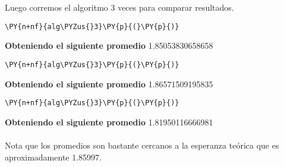 Luego corremos el algoritmo 3 veces para comparar resultados.
  \begin{tcolorbox}[breakable, size=fbox, boxrule=1pt, pad at break*=1mm,colback=cellbackground, colframe=cellborder]
\begin{Verbatim}[commandchars=\\\{\}]
\PY{n+nf}{alg\PYZus{}3}\PY{p}{(}\PY{p}{)}
\end{Verbatim}
\end{tcolorbox}
\textbf{Obteniendo el siguiente promedio}
    1.85053830658658

    
    \begin{tcolorbox}[breakable, size=fbox, boxrule=1pt, pad at break*=1mm,colback=cellbackground, colframe=cellborder]
\begin{Verbatim}[commandchars=\\\{\}]
\PY{n+nf}{alg\PYZus{}3}\PY{p}{(}\PY{p}{)}
\end{Verbatim}
\end{tcolorbox}
\textbf{Obteniendo el siguiente promedio}
    1.86571509195835

    
    \begin{tcolorbox}[breakable, size=fbox, boxrule=1pt, pad at break*=1mm,colback=cellbackground, colframe=cellborder]
\begin{Verbatim}[commandchars=\\\{\}]
\PY{n+nf}{alg\PYZus{}3}\PY{p}{(}\PY{p}{)}
\end{Verbatim}
\end{tcolorbox}
\textbf{Obteniendo el siguiente promedio}
    1.81950116666981\\
    \\
Nota que los promedios son bastante cercanos a la esperanza teórica que es aproximadamente 1.85997.
